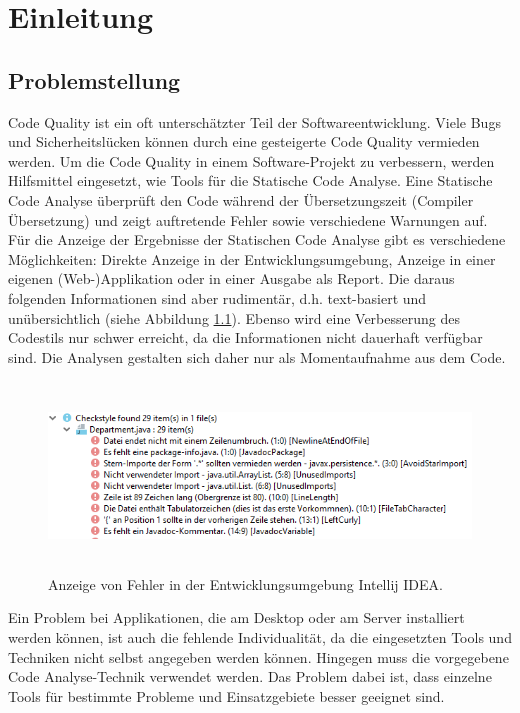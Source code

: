 \chapter{Einleitung}

\section{Problemstellung}
Code Quality ist ein oft unterschätzter Teil der Softwareentwicklung. Viele Bugs und Sicherheitslücken können durch eine gesteigerte Code Quality vermieden werden. Um die Code Quality in einem Software-Projekt zu verbessern, werden Hilfsmittel eingesetzt, wie Tools für die Statische Code Analyse. Eine Statische Code Analyse überprüft den Code während der Übersetzungszeit (Compiler Übersetzung) und zeigt auftretende Fehler sowie verschiedene Warnungen auf. Für die Anzeige der Ergebnisse der Statischen Code Analyse gibt es verschiedene Möglichkeiten: Direkte Anzeige in der Entwicklungsumgebung, Anzeige in einer eigenen (Web-)Applikation oder in einer Ausgabe als Report. Die daraus folgenden Informationen sind aber rudimentär, d.h. text-basiert und unübersichtlich (siehe Abbildung \ref{fig:findingsInIDE}). Ebenso wird eine Verbesserung des Codestils nur schwer erreicht, da die Informationen nicht dauerhaft verfügbar sind. Die Analysen gestalten sich daher nur als Momentaufnahme aus dem Code. 

\begin{figure}[tp]
  \centering
  \includegraphics[height=5cm]{images/ideChecks.PNG}
 \caption[Anzeige von Fehler in der Entwicklungsumgebung Intellij IDEA]{Anzeige von Fehler in der Entwicklungsumgebung Intellij IDEA.}
  \label{fig:findingsInIDE}
\end{figure}

Ein Problem bei Applikationen, die am Desktop oder am Server installiert werden können, ist auch die fehlende Individualität, da die eingesetzten Tools  und Techniken nicht selbst angegeben werden können. Hingegen muss die vorgegebene Code Analyse-Technik verwendet werden. Das Problem dabei ist, dass einzelne Tools für bestimmte Probleme und Einsatzgebiete besser geeignet sind.

